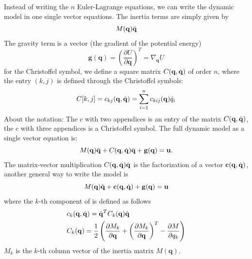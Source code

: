 \documentclass[10pt, a4paper]{report}
\newcommand{\q}{{\mathbf q}}
\begin{document}
Instead of writing the $n$ Euler-Lagrange equations, we can write the dynamic model in one single vector equations. The inertia terms are simply given by $$ M(\q)\ddq$$
The gravity term is a vector (the gradient of the potential energy)\begin{equation}
    \mathbf g(\q)=\left(\frac{\partial U}{\partial \q}\right)^T
=\nabla_\q U
\end{equation}
for the Christoffel symbol, we define a square matrix $C(\q,\dq)$ of order $n$, where the entry $(k,j)$ is defined through the Christoffel symbols:\begin{equation}
    C[k,j]=c_{kj}(\q,\dq)=\sum_{i=1}^nc_{kij}(\q)\dot q_i
\end{equation}
About the notation: The $c$ with two appendices is an entry of the matrix $C(\q,\dq)$, the $c$ with three appendices is a Christoffel symbol. The full dynamic model as a single vector equation is:\begin{equation}\label{dynModel}
    M(\q)\ddq+C(\q,\dq)\dq+\mathbf g(\q)=\mathbf u
    .
\end{equation}
The matrix-vector multiplication $C(\q,\dq)\dq$ is the factorization of a vector $\mathbf c(\q,\dq)$, another general way to write the model is
\begin{equation}
    M(\q)\ddq+\mathbf c(\q,\dq)+\mathbf g(\q)=\mathbf u
\end{equation} 
where the $k$-th component of is defined as follows\begin{align}
     &c_k(\q,\dq)=\dq^TC_k(\q)\dq\\ \label{ChrystoffelMat}
     &C_k(\q)=\frac{1}{2}\left(
        \frac{\partial M_k}{\partial \q}+\left(\frac{\partial M_k}{\partial \q}\right)^T-\frac{\partial M}{\partial q_k}
     \right)
\end{align}
$M_k$ is the $k$-th column vector of the inertia matrix $M(\q)$.\bigskip
\end{document}
